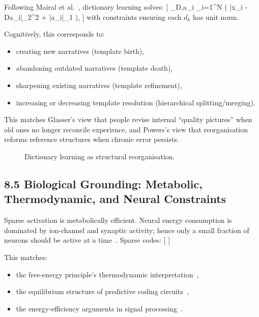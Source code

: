 \documentclass[11pt,a4paper,twoside]{article}
\begin{document}
Following Mairal et al.~\cite{mairal2010online}, dictionary learning solves:
[
\min_{D,a_i} \sum_{i=1}^N
\left(
|x_i - Da_i|_2^2 + \lambda|a_i|_1
\right),
]
with constraints ensuring each $d_k$ has unit norm.

Cognitively, this corresponds to:
\begin{itemize}
\item creating new narratives (template birth),
\item abandoning outdated narratives (template death),
\item sharpening existing narratives (template refinement),
\item increasing or decreasing template resolution (hierarchical splitting/merging).
\end{itemize}

This matches Glasser’s view that people revise internal ``quality pictures'' when old ones no longer reconcile experience, and Powers’s view that reorganisation reforms reference structures when chronic error persists.

\begin{figure}[h]
\centering
{}
\caption{Dictionary learning as structural reorganisation.}
\end{figure}

\subsection{8.5 Biological Grounding: Metabolic, Thermodynamic, and Neural Constraints}

Sparse activation is metabolically efficient. Neural energy consumption is dominated by ion-channel and synaptic activity; hence only a small fraction of neurons should be active at a time~\cite{sengupta2016}. Sparse codes:
[
]

This matches:
\begin{itemize}
\item the free-energy principle's thermodynamic interpretation~\cite{friston2010free},
\item the equilibrium structure of predictive coding circuits~\cite{whittington2019predictive},
\item the energy-efficiency arguments in signal processing~\cite{sengupta2016}.
\end{itemize}
\end{document}
